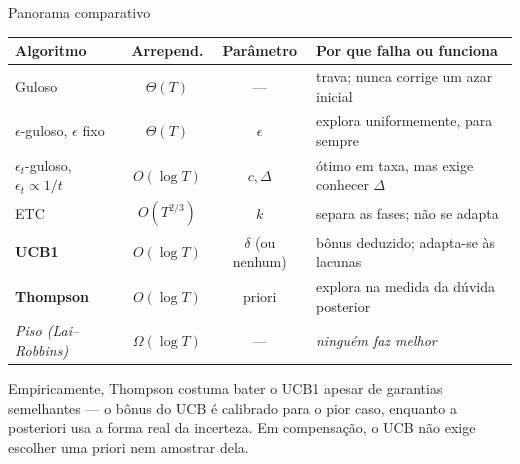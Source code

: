 \documentclass[aspectratio=169, 10pt]{beamer}
\newcommand{\gap}{\Delta}
\begin{document}
\begin{frame}{Panorama comparativo}
  \centering\small
  \begin{tabular}{lccl}
    \toprule
    \textbf{Algoritmo} & \textbf{Arrepend.} & \textbf{Parâmetro}
      & \textbf{Por que falha ou funciona} \\
    \midrule
    Guloso & $\Theta(T)$ & --- & trava; nunca corrige um azar inicial \\
    $\epsilon$-guloso, $\epsilon$ fixo & $\Theta(T)$ & $\epsilon$
      & explora uniformemente, para sempre \\
    $\epsilon_t$-guloso, $\epsilon_t \propto 1/t$ & $O(\log T)$ & $c, \gap$
      & ótimo em taxa, mas exige conhecer $\gap$ \\
    ETC & $O(T^{2/3})$ & $k$ & separa as fases; não se adapta \\
    \textbf{UCB1} & $O(\log T)$ & $\delta$ (ou nenhum)
      & bônus deduzido; adapta-se às lacunas \\
    \textbf{Thompson} & $O(\log T)$ & priori
      & explora na medida da dúvida posterior \\
    \midrule
    \emph{Piso (Lai--Robbins)} & $\Omega(\log T)$ & ---
      & \emph{ninguém faz melhor} \\
    \bottomrule
  \end{tabular}

  \vspace{0.9em}
  \begin{ideiabox}
    Empiricamente, Thompson costuma bater o UCB1 apesar de garantias
    semelhantes --- o bônus do UCB é calibrado para o pior caso, enquanto a
    posteriori usa a forma real da incerteza. Em compensação, o UCB não
    exige escolher uma priori nem amostrar dela.
  \end{ideiabox}
\end{frame}
\end{document}
